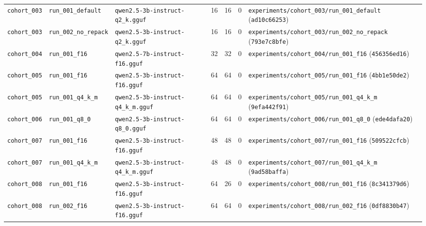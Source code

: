 {\begin{longtable}{@{}>{\raggedright\arraybackslash}p{1.5cm}>{\raggedright\arraybackslash}p{2.7cm}>{\raggedright\arraybackslash}p{3.2cm}rrr>{\raggedright\arraybackslash}p{4.2cm}@{}}
\texttt{cohort\_003} & \texttt{run\_001\_default} & \texttt{qwen2.5-\allowbreak{}3b-\allowbreak{}instruct-\allowbreak{}q2\_k.gguf} & 16 & 16 & 0 & \texttt{experiments/\allowbreak{}cohort\_003/\allowbreak{}run\_001\_default} (\texttt{ad10c66253}) \\
\texttt{cohort\_003} & \texttt{run\_002\_no\_repack} & \texttt{qwen2.5-\allowbreak{}3b-\allowbreak{}instruct-\allowbreak{}q2\_k.gguf} & 16 & 16 & 0 & \texttt{experiments/\allowbreak{}cohort\_003/\allowbreak{}run\_002\_no\_repack} (\texttt{793e7c8bfe}) \\
\texttt{cohort\_004} & \texttt{run\_001\_f16} & \texttt{qwen2.5-\allowbreak{}7b-\allowbreak{}instruct-\allowbreak{}f16.gguf} & 32 & 32 & 0 & \texttt{experiments/\allowbreak{}cohort\_004/\allowbreak{}run\_001\_f16} (\texttt{456356ed16}) \\
\texttt{cohort\_005} & \texttt{run\_001\_f16} & \texttt{qwen2.5-\allowbreak{}3b-\allowbreak{}instruct-\allowbreak{}f16.gguf} & 64 & 64 & 0 & \texttt{experiments/\allowbreak{}cohort\_005/\allowbreak{}run\_001\_f16} (\texttt{4bb1e50de2}) \\
\texttt{cohort\_005} & \texttt{run\_001\_q4\_k\_m} & \texttt{qwen2.5-\allowbreak{}3b-\allowbreak{}instruct-\allowbreak{}q4\_k\_m.gguf} & 64 & 64 & 0 & \texttt{experiments/\allowbreak{}cohort\_005/\allowbreak{}run\_001\_q4\_k\_m} (\texttt{9efa442f91}) \\
\texttt{cohort\_006} & \texttt{run\_001\_q8\_0} & \texttt{qwen2.5-\allowbreak{}3b-\allowbreak{}instruct-\allowbreak{}q8\_0.gguf} & 64 & 64 & 0 & \texttt{experiments/\allowbreak{}cohort\_006/\allowbreak{}run\_001\_q8\_0} (\texttt{ede4dafa20}) \\
\texttt{cohort\_007} & \texttt{run\_001\_f16} & \texttt{qwen2.5-\allowbreak{}3b-\allowbreak{}instruct-\allowbreak{}f16.gguf} & 48 & 48 & 0 & \texttt{experiments/\allowbreak{}cohort\_007/\allowbreak{}run\_001\_f16} (\texttt{509522cfcb}) \\
\texttt{cohort\_007} & \texttt{run\_001\_q4\_k\_m} & \texttt{qwen2.5-\allowbreak{}3b-\allowbreak{}instruct-\allowbreak{}q4\_k\_m.gguf} & 48 & 48 & 0 & \texttt{experiments/\allowbreak{}cohort\_007/\allowbreak{}run\_001\_q4\_k\_m} (\texttt{9ad58baffa}) \\
\texttt{cohort\_008} & \texttt{run\_001\_f16} & \texttt{qwen2.5-\allowbreak{}3b-\allowbreak{}instruct-\allowbreak{}f16.gguf} & 64 & 26 & 0 & \texttt{experiments/\allowbreak{}cohort\_008/\allowbreak{}run\_001\_f16} (\texttt{8c341379d6}) \\
\texttt{cohort\_008} & \texttt{run\_002\_f16} & \texttt{qwen2.5-\allowbreak{}3b-\allowbreak{}instruct-\allowbreak{}f16.gguf} & 64 & 64 & 0 & \texttt{experiments/\allowbreak{}cohort\_008/\allowbreak{}run\_002\_f16} (\texttt{0df8830b47}) \\

\end{longtable}}
